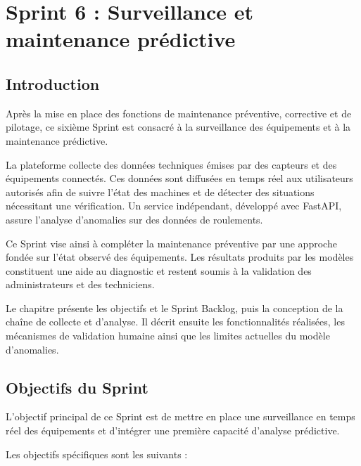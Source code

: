 \section{Sprint 6 : Surveillance et maintenance prédictive}

\subsection{Introduction}

Après la mise en place des fonctions de maintenance préventive, corrective et de pilotage, ce sixième Sprint est consacré à la surveillance des équipements et à la maintenance prédictive.

La plateforme collecte des données techniques émises par des capteurs et des équipements connectés. Ces données sont diffusées en temps réel aux utilisateurs autorisés afin de suivre l'état des machines et de détecter des situations nécessitant une vérification. Un service indépendant, développé avec FastAPI, assure l'analyse d'anomalies sur des données de roulements.

Ce Sprint vise ainsi à compléter la maintenance préventive par une approche fondée sur l'état observé des équipements. Les résultats produits par les modèles constituent une aide au diagnostic et restent soumis à la validation des administrateurs et des techniciens.

Le chapitre présente les objectifs et le Sprint Backlog, puis la conception de la chaîne de collecte et d'analyse. Il décrit ensuite les fonctionnalités réalisées, les mécanismes de validation humaine ainsi que les limites actuelles du modèle d'anomalies.

\subsection{Objectifs du Sprint}

L'objectif principal de ce Sprint est de mettre en place une surveillance en temps réel des équipements et d'intégrer une première capacité d'analyse prédictive.

Les objectifs spécifiques sont les suivants :

